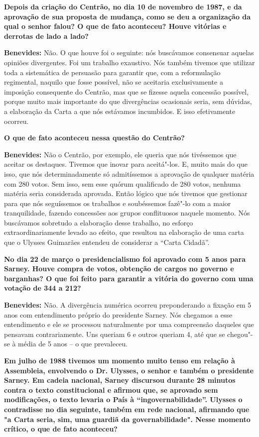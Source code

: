 \textbf{Depois da criação do Centrão, no dia 10 de novembro de 1987, e
da aprovação de sua proposta de mudança, como se deu a organização da
qual o senhor falou? O que de fato aconteceu? Houve vitórias e derrotas
de lado a lado?}

\textbf{Benevides:} Não. O que houve foi o seguinte: nós buscávamos
consensuar aquelas opiniões divergentes. Foi um trabalho exaustivo. Nós
também tivemos que utilizar toda a sistemática de persuasão para
garantir que, com a reformulação regimental, naquilo que fosse possível,
não se aceitaria exclusivamente a imposição consequente do Centrão, mas
que se fizesse aquela concessão possível, porque muito mais importante
do que divergências ocasionais seria, sem dúvidas, a elaboração da Carta
a que nós estávamos incumbidos. E isso efetivamente ocorreu.

\textbf{O que de fato aconteceu nessa questão do Centrão?}

\textbf{Benevides:} Não o Centrão, por exemplo, ele queria que nós
tivéssemos que aceitar os destaques. Tivemos que inovar para aceitá"-los.
E, muito mais do que isso, que nós determinadamente só admitíssemos a
aprovação de qualquer matéria com 280 votos. Sem isso, sem esse quórum
qualificado de 280 votos, nenhuma matéria seria considerada aprovada.
Então lógico que nós tivemos que gestionar para que nós seguíssemos os
trabalhos e soubéssemos fazê"-lo com a maior tranquilidade, fazendo
concessões aos grupos conflituosos naquele momento. Nós buscávamos
sobretudo a elaboração desse trabalho, no esforço extraordinariamente
levado ao efeito, que resultou na elaboração de uma carta que o Ulysses
Guimarães entendeu de considerar a ``Carta Cidadã''.

\textbf{No dia 22 de março o presidencialismo foi aprovado com 5 anos
para Sarney. Houve compra de votos, obtenção de cargos no governo e
barganhas? O que foi feito para garantir a vitória do governo com uma
votação de 344 a 212?}

\textbf{Benevides:} Não. A divergência numérica ocorreu preponderando a
fixação em 5 anos com entendimento próprio do presidente Sarney. Nós
chegamos a esse entendimento e ele se processou naturalmente por uma
compreensão daqueles que pensavam contrariamente. Uns queriam 6 e outros
queriam 4, até que se chegou"-se à média de 5 anos -- o que prevaleceu.

\textbf{Em julho de 1988 tivemos um momento muito tenso em relação à
Assembleia, envolvendo o Dr. Ulysses, o senhor e também o presidente
Sarney. Em cadeia nacional, Sarney discursou durante 28 minutos contra o
texto constitucional e afirmou que, se aprovado sem modificações, o
texto levaria o País à ``ingovernabilidade''. Ulysses o contradisse no
dia seguinte, também em rede nacional, afirmando que "a Carta seria,
sim, uma guardiã da governabilidade". Nesse momento crítico, o que de
fato aconteceu?}

